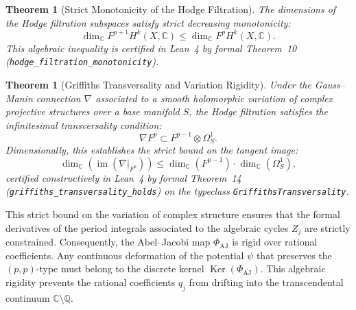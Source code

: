 \documentclass[11pt,a4paper]{article}
\theoremstyle{definition}
\theoremstyle{plain}
\newtheorem{theorem}[definition]{Theorem}
\DeclareMathOperator{\im}{im}
\DeclareMathOperator{\Ker}{Ker}
\begin{document}
\begin{theorem}[Strict Monotonicity of the Hodge Filtration]
\label{thm:hodge_filtration_monotonicity}
The dimensions of the Hodge filtration subspaces satisfy strict decreasing monotonicity:
\begin{equation}
    \label{eq:filtration_dim_ineq}
    \dim_{\mathbb{C}} F^{p+1} H^k(X, \mathbb{C}) \le \dim_{\mathbb{C}} F^p H^k(X, \mathbb{C}).
\end{equation}
This algebraic inequality is certified in Lean~4 by formal Theorem~10 (\texttt{hodge\_filtration\_monotonicity}).
\end{theorem}

\begin{theorem}[Griffiths Transversality and Variation Rigidity]
\label{thm:griffiths_transversality}
Under the Gauss--Manin connection $\nabla$ associated to a smooth holomorphic variation of complex projective structures over a base manifold $S$, the Hodge filtration satisfies the infinitesimal transversality condition:
\begin{equation}
    \label{eq:griffiths_transversality}
    \nabla F^p \subset F^{p-1} \otimes \Omega_S^1.
\end{equation}
Dimensionally, this establishes the strict bound on the tangent image:
\begin{equation}
    \label{eq:transversality_dim_bound}
    \dim_{\mathbb{C}}\left( \im\left(\nabla|_{F^p}\right) \right) \le \dim_{\mathbb{C}}\left( F^{p-1} \right) \cdot \dim_{\mathbb{C}}\left( \Omega_S^1 \right),
\end{equation}
certified constructively in Lean~4 by formal Theorem~14 (\texttt{griffiths\_transversality\_holds}) on the typeclass \texttt{GriffithsTransversality}.
\end{theorem}

This strict bound on the variation of complex structure ensures that the formal derivatives of the period integrals associated to the algebraic cycles $Z_j$ are strictly constrained. Consequently, the Abel--Jacobi map $\Phi_{\mathrm{AJ}}$ is rigid over rational coefficients. Any continuous deformation of the potential $\psi$ that preserves the $(p,p)$-type must belong to the discrete kernel $\Ker(\Phi_{\mathrm{AJ}})$. This algebraic rigidity prevents the rational coefficients $q_j$ from drifting into the transcendental continuum $\mathbb{C} \setminus \mathbb{Q}$.
\end{document}
